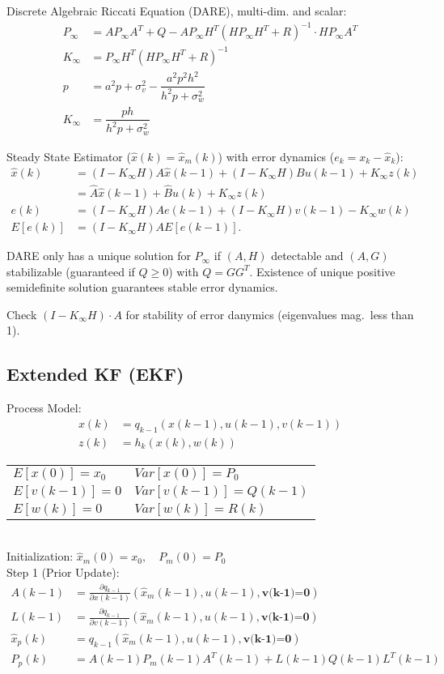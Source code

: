 \documentclass[landscape,a4paper,8pt]{scrartcl}
\begin{document}
\begin{multicols*}{3}
Discrete Algebraic Riccati Equation (DARE), multi-dim. and scalar:
\begin{align*}
P_\infty &= A P_\infty A^T + Q - A P_\infty H^T (H P_\infty H^T + R)^{-1} \cdot H P_\infty A^T \\
K_\infty &= P_\infty H^T (H P_\infty H^T + R)^{-1} \\
p &= a^2p + \sigma_v^2 - \dfrac{a^2p^2h^2}{h^2p+\sigma_w^2} \\
K_\infty &= \dfrac{ph}{h^2p+\sigma_w^2}
\end{align*}

Steady State Estimator ($\hat x(k) = \hat x_m(k)$) with error dynamics ($e_k = x_k - \hat x_k$):
\begin{align*}
\hat{x}(k) &= (I-K_\infty H) A \hat{x}(k-1) + (I-K_\infty H) B u(k-1) + K_\infty z(k) \\
&= \hat{A} \hat{x}(k-1) + \hat{B} u(k) + K_\infty z(k) \\
e(k) &= (I-K_\infty H) A e(k-1) + (I-K_\infty H) v(k-1) - K_\infty w(k) \\
E[e(k)] & = (I-K_\infty H)AE[e(k-1)].
\end{align*}

DARE only has a unique solution for $P_\infty$ if $(A,H)$ detectable and $(A,G)$ stabilizable (guaranteed if $Q \geq 0$) with $Q=GG^T$. Existence of unique positive semidefinite solution guarantees stable error dynamics. 

Check $(I-K_\infty H)\cdot A$ for stability of error danymics (eigenvalues mag.\ less than 1).

\subsection{Extended KF (EKF)}
Process Model:
\begin{align*}
x(k) &= q_{k-1}(x(k-1), u(k-1), v(k-1)) \\
z(k) &= h_k(x(k), w(k))
\end{align*}
\begin{tabular}{ll}
$E[x(0)] = x_0$ & $Var[x(0)]=P_0$ \\
$E[v(k-1)] =0$ & $Var[v(k-1)] = Q(k-1)$\\
$E[w(k)] =0$ & $Var[w(k)] = R(k)$
\end{tabular} \\


Initialization: $\hat{x}_m (0) = x_0, \quad P_m(0) = P_0$ \\

Step 1 (Prior Update):
\begin{align*}
A(k-1) &= \frac{\partial q_{k-1}}{\partial x(k-1)} (\hat{x}_m (k-1), u(k-1), \textbf{v(k-1)=0}) \\
L(k-1) &= \frac{\partial q_{k-1}}{\partial v(k-1)} (\hat{x}_m (k-1), u(k-1), \textbf{v(k-1)=0}) \\
\hat{x}_p (k) &= q_{k-1} (\hat{x}_m (k-1), u(k-1), \textbf{v(k-1)=0}) \\
P_p(k) &= A(k-1) P_m(k-1) A^T(k-1) +  L(k-1) Q(k-1) L^T(k-1) 
\end{align*}


\end{multicols*}
\end{document}
